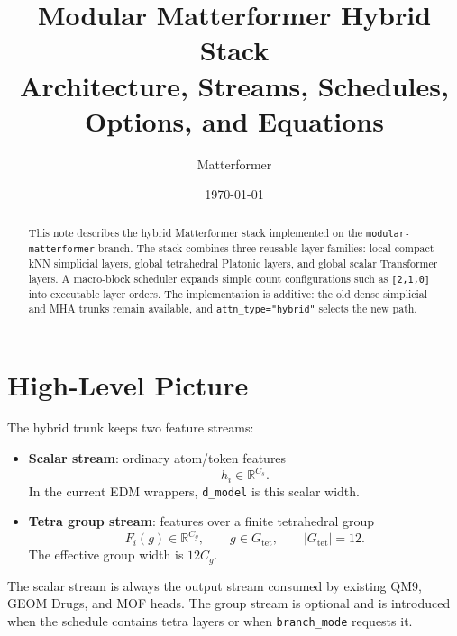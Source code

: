 \documentclass[11pt]{article}
\title{\textbf{Modular Matterformer Hybrid Stack}\\
\large Architecture, Streams, Schedules, Options, and Equations}
\author{Matterformer}
\date{\today}
\begin{document}
\maketitle

\begin{abstract}
This note describes the hybrid Matterformer stack implemented on the
\texttt{modular-matterformer} branch.  The stack combines three reusable layer
families: local compact kNN simplicial layers, global tetrahedral Platonic
layers, and global scalar Transformer layers.  A macro-block scheduler expands
simple count configurations such as \texttt{[2,1,0]} into executable layer
orders.  The implementation is additive: the old dense simplicial and MHA
trunks remain available, and \texttt{attn\_type="hybrid"} selects the new path.
\end{abstract}

\tableofcontents
\newpage

\section{High-Level Picture}

The hybrid trunk keeps two feature streams:

\begin{itemize}[leftmargin=1.5em]
  \item \textbf{Scalar stream}: ordinary atom/token features
  \[
    h_i \in \mathbb{R}^{C_s}.
  \]
  In the current EDM wrappers, \texttt{d\_model} is this scalar width.

  \item \textbf{Tetra group stream}: features over a finite tetrahedral group
  \[
    F_i(g) \in \mathbb{R}^{C_g},
    \qquad g \in G_{\mathrm{tet}},
    \qquad |G_{\mathrm{tet}}|=12.
  \]
  The effective group width is \(12 C_g\).
\end{itemize}

The scalar stream is always the output stream consumed by existing QM9, GEOM
Drugs, and MOF heads.  The group stream is optional and is introduced when the
schedule contains tetra layers or when \texttt{branch\_mode} requests it.
\end{document}
